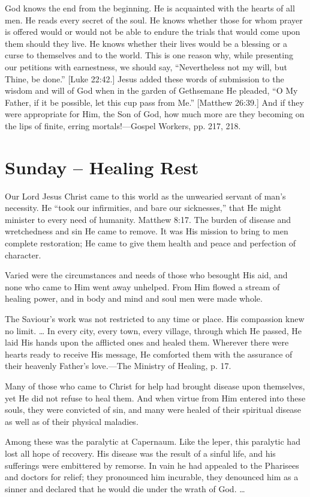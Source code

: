 \documentclass[a4paper, 10pt, twoside, headings=small]{scrartcl}
\begin{document}
\begin{multicols}{2}
God knows the end from the beginning. He is acquainted with the hearts of all men. He reads every secret of the soul. He knows whether those for whom prayer is offered would or would not be able to endure the trials that would come upon them should they live. He knows whether their lives would be a blessing or a curse to themselves and to the world. This is one reason why, while presenting our petitions with earnestness, we should say, “Nevertheless not my will, but Thine, be done.” [Luke 22:42.] Jesus added these words of submission to the wisdom and will of God when in the garden of Gethsemane He pleaded, “O My Father, if it be possible, let this cup pass from Me.” [Matthew 26:39.] And if they were appropriate for Him, the Son of God, how much more are they becoming on the lips of finite, erring mortals!—Gospel Workers, pp. 217, 218.

\section*{Sunday – Healing Rest}

Our Lord Jesus Christ came to this world as the unwearied servant of man’s necessity. He “took our infirmities, and bare our sicknesses,” that He might minister to every need of humanity. Matthew 8:17. The burden of disease and wretchedness and sin He came to remove. It was His mission to bring to men complete restoration; He came to give them health and peace and perfection of character.

Varied were the circumstances and needs of those who besought His aid, and none who came to Him went away unhelped. From Him flowed a stream of healing power, and in body and mind and soul men were made whole.

The Saviour’s work was not restricted to any time or place. His compassion knew no limit. … In every city, every town, every village, through which He passed, He laid His hands upon the afflicted ones and healed them. Wherever there were hearts ready to receive His message, He comforted them with the assurance of their heavenly Father’s love.—The Ministry of Healing, p. 17.

Many of those who came to Christ for help had brought disease upon themselves, yet He did not refuse to heal them. And when virtue from Him entered into these souls, they were convicted of sin, and many were healed of their spiritual disease as well as of their physical maladies.

Among these was the paralytic at Capernaum. Like the leper, this paralytic had lost all hope of recovery. His disease was the result of a sinful life, and his sufferings were embittered by remorse. In vain he had appealed to the Pharisees and doctors for relief; they pronounced him incurable, they denounced him as a sinner and declared that he would die under the wrath of God. …


\end{multicols}
\end{document}
